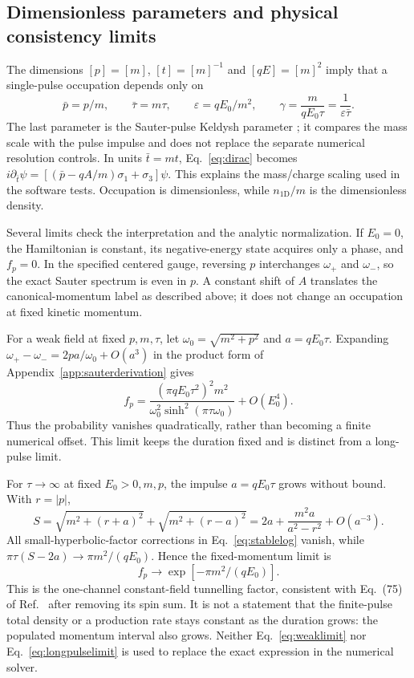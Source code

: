 \documentclass[11pt,a4paper]{article}
\begin{document}
\subsection{Dimensionless parameters and physical consistency limits}
The dimensions $[p]=[m]$, $[t]=[m]^{-1}$ and $[qE]=[m]^2$ imply that a single-pulse occupation depends only on
\begin{equation}
 \bar p=p/m,\qquad \bar\tau=m\tau,\qquad
 \varepsilon=qE_0/m^2,
 \qquad \gamma=\frac{m}{qE_0\tau}=\frac1{\varepsilon\bar\tau}.
\end{equation}
The last parameter is the Sauter-pulse Keldysh parameter \cite[Sec.~II.C.2]{Hebenstreit2010}; it compares the mass scale with the pulse impulse and does not replace the separate numerical resolution controls. In units $\bar t=mt$, Eq.~\eqref{eq:dirac} becomes $i\partial_{\bar t}\psi=[(\bar p-qA/m)\sigma_1+\sigma_3]\psi$. This explains the mass/charge scaling used in the software tests. Occupation is dimensionless, while $n_{1\mathrm D}/m$ is the dimensionless density.

Several limits check the interpretation and the analytic normalization. If $E_0=0$, the Hamiltonian is constant, its negative-energy state acquires only a phase, and $f_p=0$. In the specified centered gauge, reversing $p$ interchanges $\omega_+$ and $\omega_-$, so the exact Sauter spectrum is even in $p$. A constant shift of $A$ translates the canonical-momentum label as described above; it does not change an occupation at fixed kinetic momentum.

For a weak field at fixed $p,m,\tau$, let $\omega_0=\sqrt{m^2+p^2}$ and $a=qE_0\tau$. Expanding $\omega_+-\omega_-=2pa/\omega_0+O(a^3)$ in the product form of Appendix~\ref{app:sauterderivation} gives
\begin{equation}
 f_p=\frac{(\pi qE_0\tau^2)^2m^2}
 {\omega_0^2\sinh^2(\pi\tau\omega_0)}+O(E_0^4).
 \label{eq:weaklimit}
\end{equation}
Thus the probability vanishes quadratically, rather than becoming a finite numerical offset. This limit keeps the duration fixed and is distinct from a long-pulse limit.

For $\tau\to\infty$ at fixed $E_0>0,m,p$, the impulse $a=qE_0\tau$ grows without bound. With $r=|p|$,
\begin{equation}
 S=\sqrt{m^2+(r+a)^2}+\sqrt{m^2+(r-a)^2}
 =2a+\frac{m^2a}{a^2-r^2}+O(a^{-3}).
\end{equation}
All small-hyperbolic-factor corrections in Eq.~\eqref{eq:stablelog} vanish, while $\pi\tau(S-2a)\to\pi m^2/(qE_0)$. Hence the fixed-momentum limit is
\begin{equation}
 f_p\longrightarrow\exp[-\pi m^2/(qE_0)].
 \label{eq:longpulselimit}
\end{equation}
This is the one-channel constant-field tunnelling factor, consistent with Eq.~(75) of Ref.~\cite{Hebenstreit2010} after removing its spin sum. It is not a statement that the finite-pulse total density or a production rate stays constant as the duration grows: the populated momentum interval also grows. Neither Eq.~\eqref{eq:weaklimit} nor Eq.~\eqref{eq:longpulselimit} is used to replace the exact expression in the numerical solver.
\end{document}
